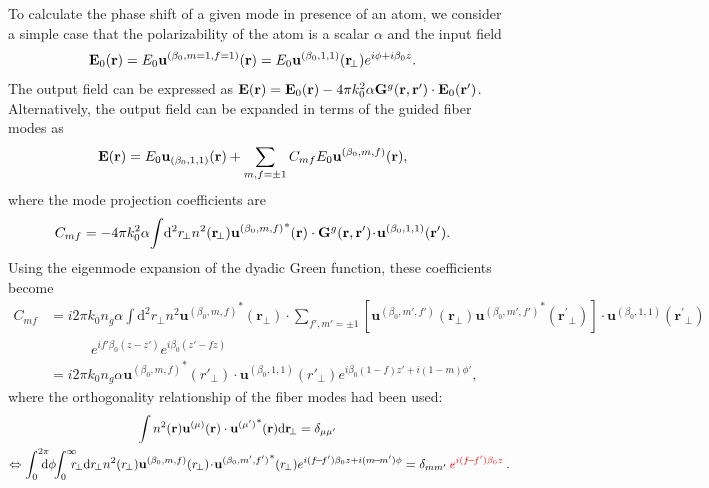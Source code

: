 \documentclass[preprint,aps,pra,onecolumn]{revtex4-1} %
\begin{document}
To calculate the phase shift of a given mode in presence of an atom, we consider a simple case that the polarizability of the atom is a scalar $\alpha$ and the input field 
\begin{align}
\mathbf{E}_0(\mathbf{r}) &= E_0 \mathbf{u}^{(\beta_0,m=1,f=1)} (\mathbf{r}) = E_0 \mathbf{u}^{(\beta_0,1,1)} (\mathbf{r}\!_\perp)e^{i\phi+i\beta_0 z}. 
\end{align}
The output field can be expressed as
$\mathbf{E}(\mathbf{r})  = \mathbf{E}_0(\mathbf{r}) -4\pi k_0^2 \alpha \mathbf{G}^g(\mathbf{r},\mathbf{r}')\cdot\mathbf{E}_0(\mathbf{r}')$.
Alternatively, the output field can be expanded in terms of the guided fiber modes as
\begin{align}
\mathbf{E}(\mathbf{r}) &= E_0\mathbf{u}_{(\beta_0,1,1)} (\mathbf{r}) + \sum_{m,f=\pm 1} C_{mf} E_0 \mathbf{u}^{(\beta_0,m,f)}(\mathbf{r}),  
\end{align}
where the mode projection coefficients are
\begin{align}
C_{mf} &= -4\pi k_0^2 \alpha \!\int\! \mathrm{d}^2r\!_\perp n^2(\mathbf{r}\!_\perp){\mathbf{u}^{(\beta_0,m,f)}}^*(\mathbf{r})\cdot \mathbf{G}^g(\mathbf{r},\mathbf{r}') \!\cdot\! \mathbf{u}^{(\beta_0,1,1)}(\mathbf{r}^\prime).
\end{align}
Using the eigenmode expansion of the dyadic Green function, these coefficients become
\begin{align}
C_{mf} &= i2\pi k_0 n_g\alpha \!\int\! \mathrm{d}^2r\!_\perp n^2 
{\mathbf{u}^{(\beta_0,m,f)}}^*(\mathbf{r}\!_\perp)\cdot\!\!\!\!\!\! \sum_{f',m'=\pm 1}\!\!\!\! 
\left[\mathbf{u}^{(\beta_0,m',f')}(\mathbf{r}\!_\perp){\mathbf{u}^{(\beta_0,m',f')}}^*(\mathbf{r}^\prime\!_\perp)
 \right]\!\cdot\! \mathbf{u}^{(\beta_0,1,1)}(\mathbf{r}^\prime\!_\perp)\nonumber\\
&\quad\quad\quad e^{if'\beta_0(z-z')} e^{i\beta_0(z'-fz)}\\
&= i2\pi k_0 n_g\alpha  {\mathbf{u}^{(\beta_0,m,f)}}^*(r'_{\!\perp})\cdot 
\mathbf{u}^{(\beta_0,1,1)}(r'_{\!\perp})e^{i\beta_0 (1-f)z'+i(1-m)\phi'},\label{eq:Cmf}
\end{align}
where the orthogonality relationship of the fiber modes had been used:
\begin{align}
\int n^2(\br)  \mathbf{u}^{(\mu)}(\br) \cdot {\mathbf{u}^{(\mu')}}^*(\br)\mathrm{d} \br\!_\perp &=\delta_{\mu\mu'}\\
\Leftrightarrow \int_0^{2\pi}\!\!\!\!\! \mathrm{d}\phi\!\! \int_0^\infty\!\!\!\! r\!_\perp \mathrm{d}r\!_\perp  n^2(r\!_\perp) \mathbf{u}^{(\beta_0,m,f)}(r\!_\perp )\!\cdot\!{\mathbf{u}^{(\beta_0,m',f')}}^*(r\!_\perp )& e^{i(f\!-\!f')\beta_0 z+i(m\! -\! m')\phi}  =\delta_{mm'}\mathbin{\color{red}e^{i(f\!-\!f')\beta_0 z}} \label{eq:orthutrans}.
\end{align}
\end{document}
